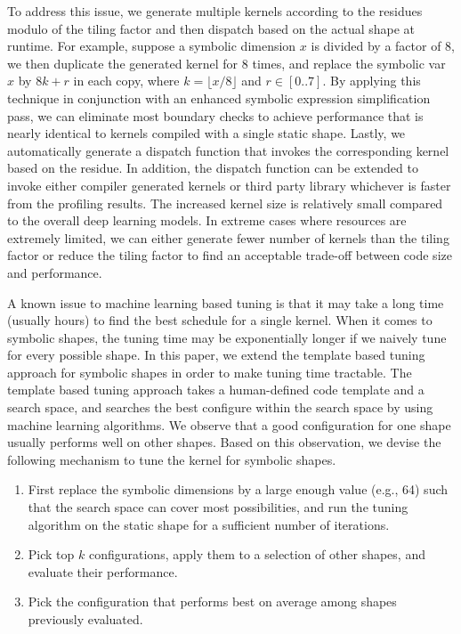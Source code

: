 To address this issue, we generate multiple kernels according to the residues modulo of the tiling factor and then dispatch based on the actual shape at runtime.
For example, suppose a symbolic dimension $x$ is divided by a factor of 8, we then duplicate the generated kernel for 8 times, and replace the symbolic var $x$ by $8k+r$ in each copy, where $k = \lfloor x / 8 \rfloor$ and $r \in [0..7]$. By applying this technique in conjunction with an enhanced symbolic expression simplification pass, we can eliminate most boundary checks to achieve performance that is nearly identical to kernels compiled with a single static shape. Lastly, we automatically generate a dispatch function that invokes the corresponding kernel based on the residue.
In addition, the dispatch function can be extended to invoke either compiler generated kernels or third party library whichever is faster from the profiling results.
The increased kernel size is relatively small compared to the overall deep learning models.
In extreme cases where resources are extremely limited, we can either generate fewer number of kernels than the tiling factor or reduce the tiling factor to find an acceptable trade-off between code size and performance.

A known issue to machine learning based tuning is that it may take a long time (usually hours) to find the best schedule for a single kernel. When it comes to symbolic shapes, the tuning time may be exponentially longer if we naively tune for every possible shape. In this paper, we extend the template based tuning approach for symbolic shapes in order to make tuning time tractable. The template based tuning approach takes a human-defined code template and a search space, and searches the best configure within the search space by using machine learning algorithms.
We observe that a good configuration for one shape usually performs well on other shapes. Based on this observation, we devise the following mechanism to tune the kernel for symbolic shapes.

\vspace{-6pt}
\begin{enumerate}[leftmargin=*]
    \itemsep 0em
    \item First replace the symbolic dimensions by a large enough value (e.g., 64) such that the search space can cover most possibilities, and run the tuning algorithm on the static shape for a sufficient number of iterations.
    \item Pick top $k$ configurations, apply them to a selection of other shapes, and evaluate their performance.
    \item Pick the configuration that performs best on average among shapes previously evaluated.
    \vspace{-6pt}
\end{enumerate}


